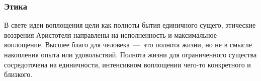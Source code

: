 \subsubsection{Этика}

В свете идеи воплощения цели как полноты бытия единичного сущего, этические воззрения Аристотеля направлены на исполненность и максимальное воплощение. Высшее благо для человека~---~это полнота жизни, но не в смысле накопления опыта или удовольствий. Полнота жизни для ограниченного существа сосредоточена на единичности, интенсивном воплощении чего-то конкретного и близкого.

